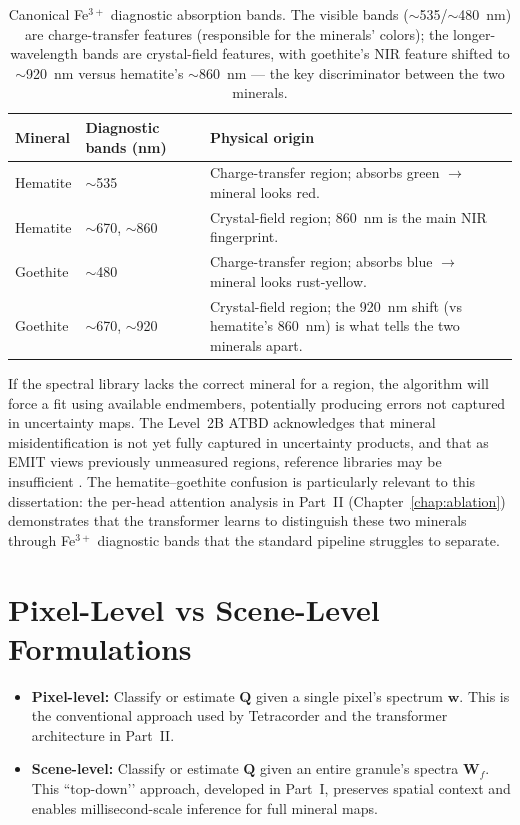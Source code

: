 \documentclass[11pt]{report}
\begin{document}
\begin{table}[!htbp]
\centering
\small
\caption{Canonical Fe$^{3+}$ diagnostic absorption bands. The visible bands ($\sim$535/$\sim$480~nm) are charge-transfer features (responsible for the minerals' colors); the longer-wavelength bands are crystal-field features, with goethite's NIR feature shifted to $\sim$920~nm versus hematite's $\sim$860~nm --- the key discriminator between the two minerals.}
\label{tab:fe_diagnostics}
\begin{tabular}{p{}p{}p{}}
\hline
\rowcolor[gray]{0.85}
\textbf{Mineral} & \textbf{Diagnostic bands (nm)} & \textbf{Physical origin} \\
\hline
Hematite & $\sim$535 & Charge-transfer region; absorbs green $\to$ mineral looks red. \\
\hline
Hematite & $\sim$670, $\sim$860 & Crystal-field region; 860~nm is the main NIR fingerprint. \\
\hline
Goethite & $\sim$480 & Charge-transfer region; absorbs blue $\to$ mineral looks rust-yellow. \\
\hline
Goethite & $\sim$670, $\sim$920 & Crystal-field region; the 920~nm shift (vs hematite's 860~nm) is what tells the two minerals apart. \\
\hline
\end{tabular}
\end{table}

If the spectral library lacks the correct mineral for a region, the algorithm will force a fit using available endmembers, potentially producing errors not captured in uncertainty maps. The Level~2B ATBD acknowledges that mineral misidentification is not yet fully captured in uncertainty products, and that as EMIT views previously unmeasured regions, reference libraries may be insufficient \cite{emit_l3_atbd}. The hematite--goethite confusion is particularly relevant to this dissertation: the per-head attention analysis in Part~II (Chapter~\ref{chap:ablation}) demonstrates that the transformer learns to distinguish these two minerals through Fe$^{3+}$ diagnostic bands that the standard pipeline struggles to separate.

\section{Pixel-Level vs Scene-Level Formulations}

\begin{itemize}
  \item \textbf{Pixel-level:} Classify or estimate $\mathbf{Q}$ given a single pixel’s spectrum $\mathbf{w}$. This is the conventional approach used by Tetracorder and the transformer architecture in Part~II.
  \item \textbf{Scene-level:} Classify or estimate $\mathbf{Q}$ given an entire granule’s spectra $\mathbf{W}_f$. This ``top-down’’ approach, developed in Part~I, preserves spatial context and enables millisecond-scale inference for full mineral maps.
\end{itemize}
\end{document}
